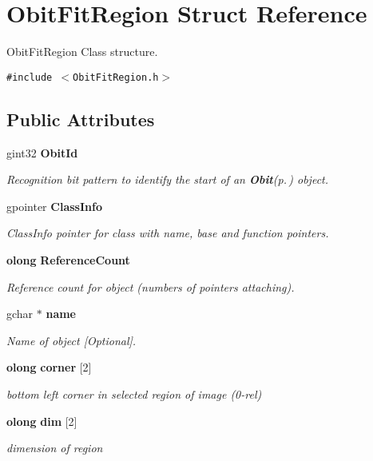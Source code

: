 \section{Obit\-Fit\-Region Struct Reference}
\label{structObitFitRegion}
Obit\-Fit\-Region Class structure.  


{\tt \#include $<$Obit\-Fit\-Region.h$>$}

\subsection*{Public Attributes}
\begin{CompactItemize}
\item 
gint32 {\bf Obit\-Id}
\begin{CompactList}\small\item\em Recognition bit pattern to identify the start of an {\bf Obit}{\rm (p.\,\pageref{structObit})} object. \item\end{CompactList}\item 
gpointer {\bf Class\-Info}
\begin{CompactList}\small\item\em Class\-Info pointer for class with name, base and function pointers. \item\end{CompactList}\item 
{\bf olong} {\bf Reference\-Count}
\begin{CompactList}\small\item\em Reference count for object (numbers of pointers attaching). \item\end{CompactList}\item 
gchar $\ast$ {\bf name}
\begin{CompactList}\small\item\em Name of object [Optional]. \item\end{CompactList}\item 
{\bf olong} {\bf corner} [2]
\begin{CompactList}\small\item\em bottom left corner in selected region of image (0-rel) \item\end{CompactList}\item 
{\bf olong} {\bf dim} [2]
\begin{CompactList}\small\item\em dimension of region \item\end{CompactList}\item 

\end{CompactItemize}
